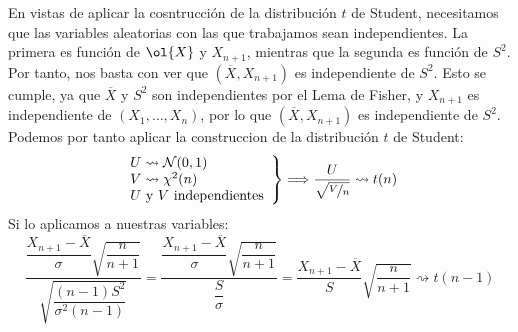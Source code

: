 \begin{ejercicio}
    En vistas de aplicar la cosntrucción de la distribución $t$ de Student, necesitamos que las variables aleatorias con las que trabajamos sean independientes. La primera es función de $\ol{X}$ y $X_{n+1}$, mientras que la segunda es función de $S^2$. Por tanto, nos basta con ver que $(\overline{X}, X_{n+1})$ es independiente de $S^2$. Esto se cumple, ya que $\overline{X}$ y $S^2$ son independientes por el Lema de Fisher, y $X_{n+1}$ es independiente de $(X_1, \ldots, X_n)$, por lo que $(\overline{X}, X_{n+1})$ es independiente de $S^2$. Podemos por tanto aplicar la construccion de la distribución $t$ de Student:
    \begin{equation*}
        \left.\begin{array}{l}
                U\rightsquigarrow \mathcal{N}(0,1) \\
                V\rightsquigarrow\chi^2(n)\\
                U \text{ y } V \text{ independientes}
        \end{array}\right\} \Longrightarrow \dfrac{U}{\sqrt{\nicefrac{V}{n}}} \rightsquigarrow t(n)
    \end{equation*}
    Si lo aplicamos a nuestras variables:
    \begin{equation*}
        \dfrac{\dfrac{X_{n+1}-\overline{X}}{\sigma}\sqrt{\dfrac{n}{n+1}}}{\sqrt{\dfrac{(n-1)S^2}{\sigma^2(n-1)}}} = \dfrac{\dfrac{X_{n+1}-\overline{X}}{\sigma}\sqrt{\dfrac{n}{n+1}}}{\dfrac{S}{\sigma}} = \dfrac{X_{n+1}- \overline{X}}{S}\sqrt{\dfrac{n}{n+1}} \rightsquigarrow t(n-1)
    \end{equation*}
\end{ejercicio}

